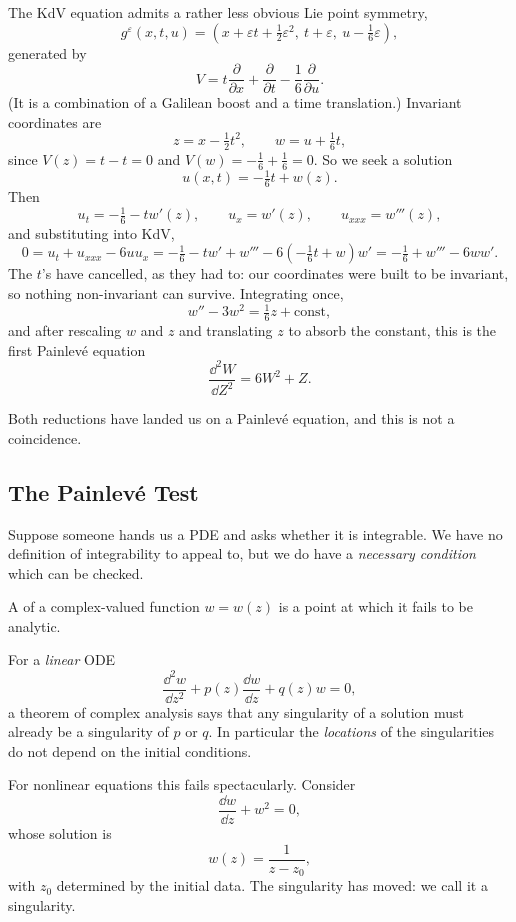 \begin{example}[KdV]
	The KdV equation admits a rather less obvious Lie point symmetry,
	$$
	g^\varepsilon(x,t,u) = \left(x + \varepsilon t + \tfrac12\varepsilon^2,\ t+\varepsilon,\ u - \tfrac16\varepsilon\right),
	$$
	generated by
	$$
	V = t\frac{\partial}{\partial x} + \frac{\partial}{\partial t} - \frac16\frac{\partial}{\partial u}.
	$$
	(It is a combination of a Galilean boost and a time translation.) Invariant coordinates are
	$$
	z = x - \tfrac12t^2, \qquad w = u + \tfrac16 t,
	$$
	since $V(z) = t - t = 0$ and $V(w) = -\frac16+\frac16 = 0$. So we seek a solution
	$$
	u(x,t) = -\tfrac16t + w(z).
	$$
	Then
	$$
	u_t = -\tfrac16 - tw'(z), \qquad u_x = w'(z), \qquad u_{xxx} = w'''(z),
	$$
	and substituting into KdV,
	$$
	0 = u_t + u_{xxx} - 6uu_x = -\tfrac16 - tw' + w''' - 6\left(-\tfrac16t + w\right)w' = -\tfrac16 + w''' - 6ww'.
	$$
	The $t$'s have cancelled, as they had to: our coordinates were built to be invariant, so nothing non-invariant can survive. Integrating once,
	$$
	w'' - 3w^2 = \tfrac16z + \text{const},
	$$
	and after rescaling $w$ and $z$ and translating $z$ to absorb the constant, this is the first Painlev\'e equation
	$$
	\frac{\dd^2W}{\dd Z^2} = 6W^2 + Z.
	$$
\end{example}

Both reductions have landed us on a Painlev\'e equation, and this is not a coincidence.

\subsection{The Painlev\'e Test}

Suppose someone hands us a PDE and asks whether it is integrable. We have no definition of integrability to appeal to, but we do have a \emph{necessary condition} which can be checked.

\begin{definition}[Singularity]
	A  of a complex-valued function $w = w(z)$ is a point at which it fails to be analytic.
\end{definition}

For a \emph{linear} ODE
$$
\frac{\dd^2w}{\dd z^2} + p(z)\frac{\dd w}{\dd z} + q(z)w = 0,
$$
a theorem of complex analysis says that any singularity of a solution must already be a singularity of $p$ or $q$. In particular the \emph{locations} of the singularities do not depend on the initial conditions.

For nonlinear equations this fails spectacularly. Consider
$$
\frac{\dd w}{\dd z} + w^2 = 0,
$$
whose solution is
$$
w(z) = \frac{1}{z - z_0},
$$
with $z_0$ determined by the initial data. The singularity has moved: we call it a  singularity.

